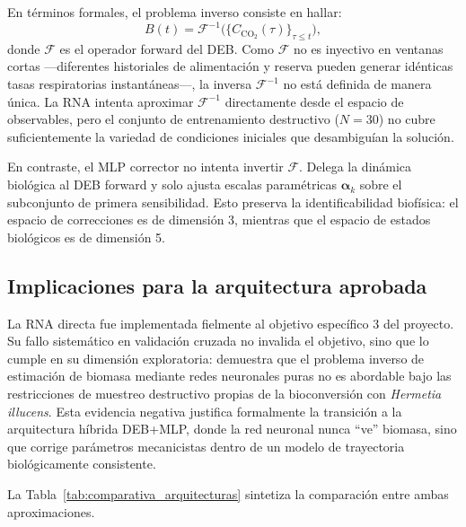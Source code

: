 En términos formales, el problema inverso consiste en hallar:
\begin{equation}
B(t) = \mathcal{F}^{-1}\big( \{C_{\mathrm{CO_2}}(\tau)\}_{\tau \leq t} \big),
\end{equation}
donde $\mathcal{F}$ es el operador forward del DEB. Como $\mathcal{F}$ no es inyectivo en ventanas cortas —diferentes historiales de alimentación y reserva pueden generar idénticas tasas respiratorias instantáneas—, la inversa $\mathcal{F}^{-1}$ no está definida de manera única. La RNA intenta aproximar $\mathcal{F}^{-1}$ directamente desde el espacio de observables, pero el conjunto de entrenamiento destructivo ($N=30$) no cubre suficientemente la variedad de condiciones iniciales que desambiguían la solución.

En contraste, el MLP corrector no intenta invertir $\mathcal{F}$. Delega la dinámica biológica al DEB forward y solo ajusta escalas paramétricas $\boldsymbol{\alpha}_k$ sobre el subconjunto de primera sensibilidad. Esto preserva la identificabilidad biofísica: el espacio de correcciones es de dimensión 3, mientras que el espacio de estados biológicos es de dimensión 5.

\subsection{Implicaciones para la arquitectura aprobada}
\label{subsec:rna_b_implicaciones}
La RNA directa fue implementada fielmente al objetivo específico 3 del proyecto. Su fallo sistemático en validación cruzada no invalida el objetivo, sino que lo cumple en su dimensión exploratoria: demuestra que el problema inverso de estimación de biomasa mediante redes neuronales puras no es abordable bajo las restricciones de muestreo destructivo propias de la bioconversión con \emph{Hermetia illucens}. Esta evidencia negativa justifica formalmente la transición a la arquitectura híbrida DEB+MLP, donde la red neuronal nunca ``ve'' biomasa, sino que corrige parámetros mecanicistas dentro de un modelo de trayectoria biológicamente consistente.

La Tabla~\ref{tab:comparativa_arquitecturas} sintetiza la comparación entre ambas aproximaciones.

